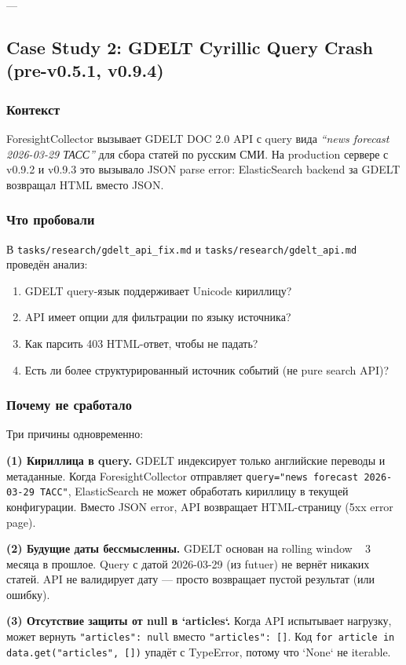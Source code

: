 ---

\subsection{Case Study 2: GDELT Cyrillic Query Crash (pre-v0.5.1, v0.9.4)}

\subsubsection*{Контекст}
ForesightCollector вызывает GDELT DOC 2.0 API с query вида \emph{``news forecast 2026-03-29 ТАСС''} для сбора статей по русским СМИ. На production сервере с v0.9.2 и v0.9.3 это вызывало JSON parse error: ElasticSearch backend за GDELT возвращал HTML вместо JSON.

\subsubsection*{Что пробовали}
В \texttt{tasks/research/gdelt\_api\_fix.md} и \texttt{tasks/research/gdelt\_api.md} проведён анализ:
\begin{enumerate}
\item GDELT query-язык поддерживает Unicode кириллицу?
\item API имеет опции для фильтрации по языку источника?
\item Как парсить 403 HTML-ответ, чтобы не падать?
\item Есть ли более структурированный источник событий (не pure search API)?
\end{enumerate}

\subsubsection*{Почему не сработало}
Три причины одновременно:

\textbf{(1) Кириллица в query.} GDELT индексирует только английские переводы и метаданные. Когда ForesightCollector отправляет \texttt{query="news forecast 2026-03-29 ТАСС"}, ElasticSearch не может обработать кириллицу в текущей конфигурации. Вместо JSON error, API возвращает HTML-страницу (5xx error page).

\textbf{(2) Будущие даты бессмысленны.} GDELT основан на rolling window ~ 3 месяца в прошлое. Query с датой 2026-03-29 (из futuer) не вернёт никаких статей. API не валидирует дату --- просто возвращает пустой результат (или ошибку).

\textbf{(3) Отсутствие защиты от null в `articles`.} Когда API испытывает нагрузку, может вернуть \texttt{{"articles": null}} вместо \texttt{{"articles": []}}. Код \texttt{for article in data.get("articles", [])} упадёт с TypeError, потому что `None` не iterable.

